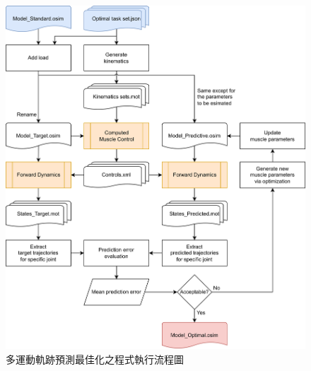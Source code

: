 \begin{figure}[!ht]
	\centering
	\includegraphics[width=15cm]{figure/ch4_flowchart_MKTP.PNG}
    \caption[多運動軌跡預測最佳化之程式執行流程圖]{多運動軌跡預測最佳化之程式執行流程圖}
    \label{ch4_flowchart_MKTP}
\end{figure}

